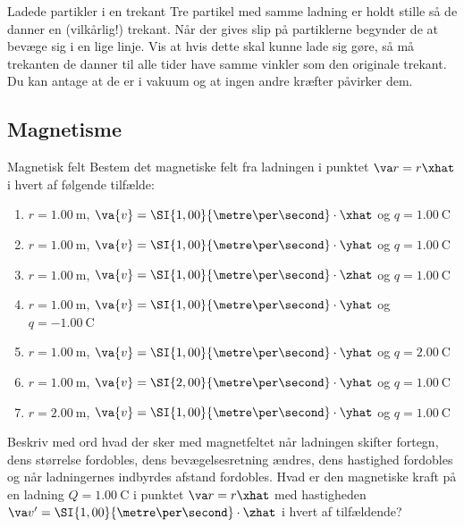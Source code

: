 \begin{opgave}{Ladede partikler i en trekant}
    Tre partikel med samme ladning er holdt stille så de danner en (vilkårlig!) trekant. Når der gives slip på partiklerne begynder de at bevæge sig i en lige linje. Vis at hvis dette skal kunne lade sig gøre, så må trekanten de danner til alle tider have samme vinkler som den originale trekant. Du kan antage at de er i vakuum og at ingen andre kræfter påvirker dem.
\end{opgave}

\subsection*{Magnetisme}
\begin{opgave}{Magnetisk felt}
    \opg Bestem det magnetiske felt fra ladningen i punktet $\va r = r \xhat$ i hvert af følgende tilfælde:
    \begin{enumerate}
        \item  $r = \SI{1,00}{\metre}$, $\va{v} = \SI{1,00}{\metre\per\second}\cdot\xhat$ og $q = \SI{1,00}{\coulomb}$
        \item $r = \SI{1,00}{\metre}$,  $\va{v} = \SI{1,00}{\metre\per\second}\cdot\yhat$ og $q = \SI{1,00}{\coulomb}$
        \item $r = \SI{1,00}{\metre}$,  $\va{v} = \SI{1,00}{\metre\per\second}\cdot\zhat$ og $q = \SI{1,00}{\coulomb}$
        \item $r = \SI{1,00}{\metre}$,  $\va{v} = \SI{1,00}{\metre\per\second}\cdot\yhat$ og $q = \SI{-1,00}{\coulomb}$
        \item $r = \SI{1,00}{\metre}$,  $\va{v} = \SI{1,00}{\metre\per\second}\cdot\yhat$ og $q = \SI{2,00}{\coulomb}$
        \item $r = \SI{1,00}{\metre}$,  $\va{v} = \SI{2,00}{\metre\per\second}\cdot\yhat$ og $q = \SI{1,00}{\coulomb}$
        \item $r = \SI{2,00}{\metre}$,  $\va{v} = \SI{1,00}{\metre\per\second}\cdot\yhat$ og $q = \SI{1,00}{\coulomb}$
    \end{enumerate}
    \opg Beskriv med ord hvad der sker med magnetfeltet når ladningen skifter fortegn, dens størrelse fordobles, dens bevægelsesretning ændres, dens hastighed fordobles og når ladningernes indbyrdes afstand fordobles.
    \opg Hvad er den magnetiske kraft på en ladning $Q = \SI{1,00}{\coulomb}$ i punktet $\va r = r \xhat$ med hastigheden $\va v' = \SI{1,00}{\metre\per\second}\cdot\zhat$ i hvert af tilfældende?
\end{opgave}

